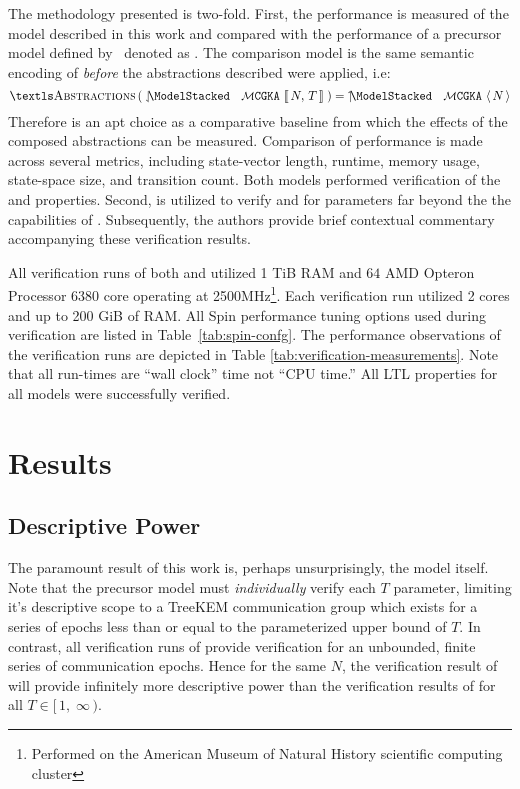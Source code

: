 \documentclass[runningheads]{llncs}
\newcommand{\Abrev}[1]{\gls{#1}}
\newcommand{\Parens}[1]{\ensuremath{\left(\;#1\;\right)}\xspace}
\newcommand{\NumericRangeOpenR}[2]{\ensuremath{[\,#1,\; #2\,)}\xspace}
\begin{document}
The methodology presented is two-fold.
First, the performance is measured of the model  described in this work and compared with the performance of a precursor model defined by~\cite{washburn2022formal} 
denoted as .
The comparison model  is the same semantic encoding of  \emph{before} the abstractions described were applied, i.e:  $$\Code{Abstractions}\Parens{\CGKAmodNT{N}{T}} =  \CGKAmodN{N}$$
Therefore  is an apt choice as a comparative baseline from which the effects of the composed abstractions can be measured.
Comparison of performance is made across several metrics, including state-vector length, runtime, memory usage, state-space size, and transition count.
Both models performed verification of the  and  properties.
Second,  is utilized to verify  and  for parameters far beyond the the capabilities of .
Subsequently, the authors provide brief contextual commentary accompanying these verification results.

All verification runs of both  and  utilized 1 TiB RAM and \(64\) AMD Opteron Processor 6380 core operating at 2500MHz\footnote{Performed on the American Museum of Natural History scientific computing cluster}.
Each verification run utilized 2 cores and up to 200 GiB of RAM.
All Spin performance tuning options used during verification are listed in Table~\ref{tab:spin-confg}.
The performance observations of the verification runs are depicted in Table \ref{tab:verification-measurements}.
Note that all run-times are ``wall clock'' time not ``CPU time.''
All \Abrev{LTL} properties for all models were successfully verified.


\section{Results}

\subsection{Descriptive Power\label{sec:descriptive-power}}

The paramount result of this work is, perhaps unsurprisingly, the model  itself.
Note that the precursor model  must \emph{individually} verify each $T$ parameter, limiting it's descriptive scope to a TreeKEM communication group which exists for a series of epochs less than or equal to the parameterized upper bound of $T$.
In contrast, all verification runs of   provide verification for an unbounded, finite series of communication epochs.
Hence for the same $N$, the verification result of  will provide infinitely more descriptive power than the verification results of  for all $T \in \NumericRangeOpenR{1}{\infty}$. %
\end{document}
